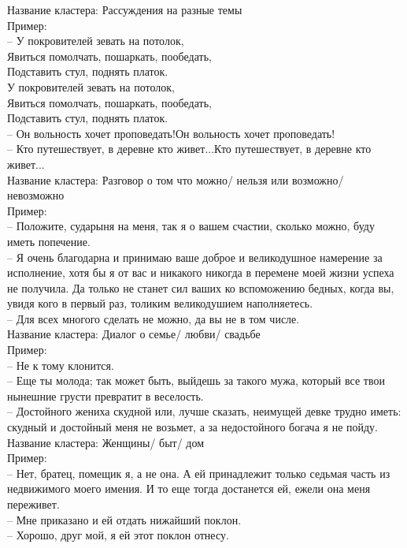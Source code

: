 \documentclass[a4paper,14pt]{article}
\begin{document}
Название кластера: Рассуждения на разные темы \\
Пример: \\
-- У покровителей зевать на потолок, \\
Явиться помолчать, пошаркать, пообедать, \\
Подставить стул, поднять платок. \\ 
У покровителей зевать на потолок, \\ 
Явиться помолчать, пошаркать, пообедать, \\
Подставить стул, поднять платок. \\
-- Он вольность хочет проповедать!Он вольность хочет проповедать! \\
-- Кто путешествует, в деревне кто живет...Кто путешествует, в деревне кто живет... \\



Название кластера: Разговор о том что можно/ нельзя или возможно/ невозможно\\
Пример: \\
-- Положите, сударыня на меня, так я о вашем счастии, сколько можно, буду иметь попечение. \\
-- Я очень благодарна и принимаю ваше доброе и великодушное намерение за исполнение,
              хотя бы я от вас и никакого никогда в перемене моей жизни успеха не получила. Да
              только не станет сил ваших ко вспоможению бедных, когда вы, увидя кого в первый раз,
              толиким великодушием наполняетесь. \\
-- Для всех многого сделать не можно, да вы не в том числе. \\



Название кластера: Диалог о семье/ любви/ свадьбе\\
Пример: \\
-- Не к тому клонится. \\
-- Еще ты молода; так может быть, выйдешь за такого мужа, который все твои нынешние
              грусти превратит в веселость. \\
-- Достойного жениха скудной или, лучше сказать, неимущей девке трудно иметь: скудный и
              достойный меня не возьмет, а за недостойного богача я не пойду. \\



Название кластера: Женщины/ быт/ дом\\
Пример: \\
-- Нет, братец, помещик я, а не она. А ей принадлежит только седьмая часть из
              недвижимого моего имения. И то еще тогда достанется ей, ежели она меня переживет. \\
-- Мне приказано и ей отдать нижайший поклон. \\
-- Хорошо, друг мой, я ей этот поклон отнесу. \\
\end{document}
